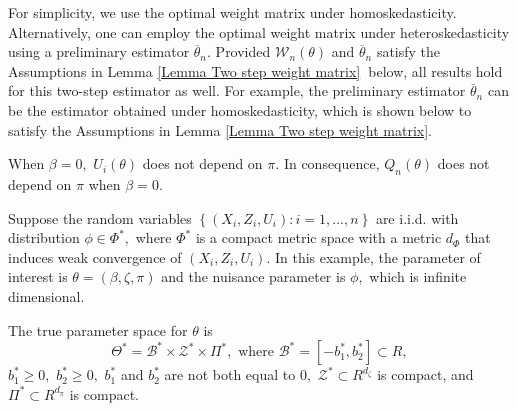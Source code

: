 \documentclass[12pt,thmsb,titlepage,final,oneside,letterpaper]{article}
\begin{document}
For simplicity, we use the optimal weight matrix under homoskedasticity.
Alternatively, one can employ the optimal weight matrix under
heteroskedasticity using a preliminary estimator $\overline{\theta }_{n}.$
Provided $\mathcal{W}_{n}(\theta )$ and $\overline{\theta }_{n}$ satisfy the
Assumptions in Lemma \ref{Lemma Two step weight matrix}\textbf{\ }below, all
results hold for this two-step estimator as well. For example, the
preliminary estimator $\overline{\theta }_{n}$ can be the estimator obtained
under homoskedasticity, which is shown below to satisfy the Assumptions in
Lemma \ref{Lemma Two step weight matrix}.

When $\beta =0,$ $U_{i}(\theta )$ does not depend on $\pi .$ In consequence, 
$Q_{n}(\theta )$ does not depend on $\pi $ when $\beta =0.$

Suppose the random variables $\left\{ \left( X_{i},Z_{i},U_{i}\right)
:i=1,...,n\right\} $ are i.i.d. with distribution $\phi \in \Phi ^{\ast },$
where $\Phi ^{\ast }$ is a compact metric space with a metric $d_{\Phi }$
that induces weak convergence of $(X_{i},Z_{i},U_{i}).$ In this example, the
parameter of interest is $\theta =(\beta ,\zeta ,\pi )$ and the nuisance
parameter is $\phi ,$ which is infinite dimensional.

The true parameter space for $\theta $ is%
\begin{equation}
\Theta ^{\ast }=\mathcal{B}^{\ast }\times \mathcal{Z}^{\ast }\times \Pi
^{\ast },\text{ where }\mathcal{B}^{\ast }=[-b_{1}^{\ast },b_{2}^{\ast
}]\subset R,  \label{gmm theta space}
\end{equation}%
$b_{1}^{\ast }\geq 0,$ $b_{2}^{\ast }\geq 0,$ $b_{1}^{\ast }$ and $%
b_{2}^{\ast }$ are not both equal to $0,$ $\mathcal{Z}^{\ast }\subset
R^{d_{\zeta }}$ is compact, and $\Pi ^{\ast }\subset R^{d_{\pi }}$ is
compact.
\end{document}

